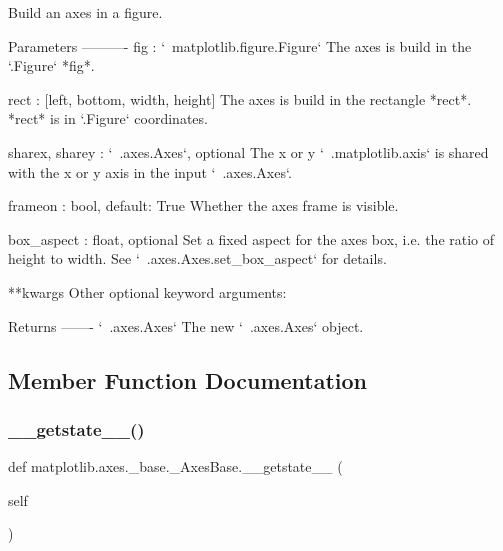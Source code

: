 \begin{DoxyVerb}Build an axes in a figure.

Parameters
----------
fig : `~matplotlib.figure.Figure`
    The axes is build in the `.Figure` *fig*.

rect : [left, bottom, width, height]
    The axes is build in the rectangle *rect*. *rect* is in
    `.Figure` coordinates.

sharex, sharey : `~.axes.Axes`, optional
    The x or y `~.matplotlib.axis` is shared with the x or
    y axis in the input `~.axes.Axes`.

frameon : bool, default: True
    Whether the axes frame is visible.

box_aspect : float, optional
    Set a fixed aspect for the axes box, i.e. the ratio of height to
    width. See `~.axes.Axes.set_box_aspect` for details.

**kwargs
    Other optional keyword arguments:


Returns
-------
`~.axes.Axes`
    The new `~.axes.Axes` object.
\end{DoxyVerb}
 

\subsection{Member Function Documentation}
\mbox{\label{classmatplotlib_1_1axes_1_1__base_1_1__AxesBase_a65eebfbe872660fc594798db230d8f2e}} 
\subsubsection{\texorpdfstring{\+\_\+\+\_\+getstate\+\_\+\+\_\+()}{\_\_getstate\_\_()}}
{\footnotesize\ttfamily def matplotlib.\+axes.\+\_\+base.\+\_\+\+Axes\+Base.\+\_\+\+\_\+getstate\+\_\+\+\_\+ (\begin{DoxyParamCaption}\item[{}]{self }\end{DoxyParamCaption})}

\mbox{\label{classmatplotlib_1_1axes_1_1__base_1_1__AxesBase_a0070adf438042b802439efcdb621bcae}} 
